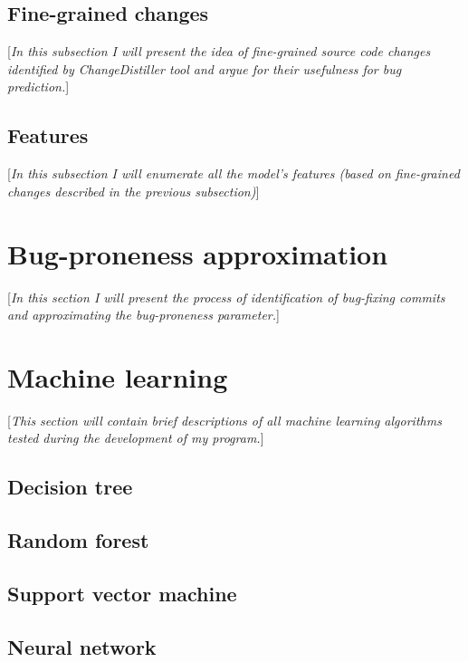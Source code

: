 \documentclass{pracamgr}
\begin{document}
\subsection{Fine-grained changes}
\label{sec:fine-grained_changes}
[\textit{In this subsection I will present the idea of fine-grained source code changes identified by ChangeDistiller tool and argue for their usefulness for bug prediction.}]

\subsection{Features}
\label{sec:features}
[\textit{In this subsection I will enumerate all the model's features (based on fine-grained changes described in the previous subsection)}]

\section{Bug-proneness approximation}
\label{sec:bug-proneness}
[\textit{In this section I will present the process of identification of bug-fixing commits and approximating the bug-proneness parameter.}]

\section{Machine learning}
\label{sec:machine_learning}
[\textit{This section will contain brief descriptions of all machine learning algorithms tested during the development of my program.}]

\subsection{Decision tree}
\label{sec:decision_tree}

\subsection{Random forest}
\label{sec:random_forest}

\subsection{Support vector machine}
\label{sec:svm}

\subsection{Neural network}
\label{sec:neural_net}
\end{document}
